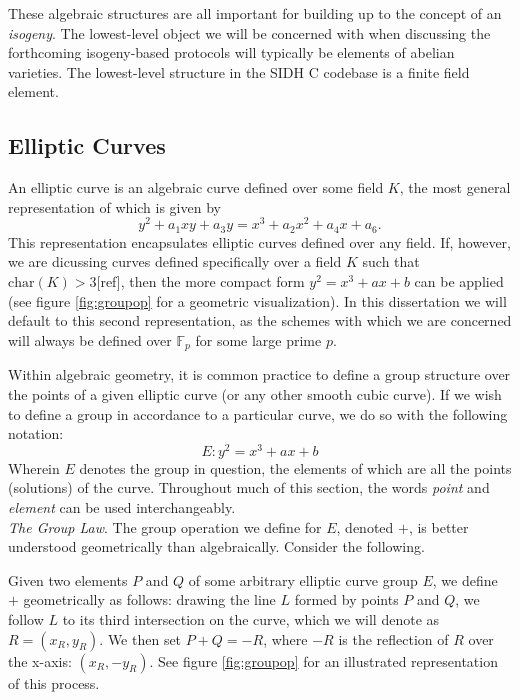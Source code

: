 These algebraic structures are all important for building up to the concept of an \emph{isogeny}. The lowest-level object we will be concerned with when discussing the forthcoming isogeny-based protocols will typically be elements of abelian varieties. The lowest-level structure in the SIDH C codebase is a finite field element.\\

\subsection{Elliptic Curves}

An elliptic curve is an algebraic curve defined over some field $K$, the most general representation of which is given by
$$
y^2 + a_{1}xy + a_{3}y = x^3 + a_{2}x^2 + a_{4}x + a_6.
$$
This representation encapsulates elliptic curves defined over any field. If, however, we are dicussing curves defined specifically over a field $K$ such that $\text{char}(K) > 3$[ref], then the more compact form $y^2 = x^3 + ax + b$ can be applied (see figure \ref{fig:groupop} for a geometric visualization). In this dissertation we will default to this second representation, as the schemes with which we are concerned will always be defined over $\mathbb{F}_p$ for some large prime $p$.

Within algebraic geometry, it is common practice to define a group structure over the points of a given elliptic curve (or any other smooth cubic curve). If we wish to define a group in accordance to a particular curve, we do so with the following notation:
$$
E: y^2 = x^3 + ax + b
$$
Wherein $E$ denotes the group in question, the elements of which are all the points (solutions) of the curve. Throughout much of this section, the words \emph{point} and \emph{element} can be used interchangeably.\\

\noindent
\emph{The Group Law}. The group operation we define for $E$, denoted $+$, is better understood geometrically than algebraically. Consider the following.

Given two elements $P$ and $Q$ of some arbitrary elliptic curve group $E$, we define $+$ geometrically as follows: drawing the line $L$ formed by points $P$ and $Q$, we follow $L$ to its third intersection on the curve, which we will denote as $R = (x_R, y_R)$. We then set $P + Q = -R$, where $-R$ is the reflection of $R$ over the x-axis: $(x_R, -y_R)$. See figure \ref{fig:groupop} for an illustrated representation of this process.

